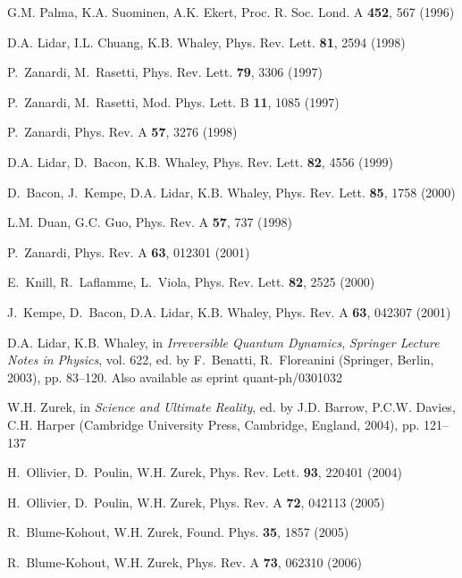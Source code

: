 \documentclass[aps,pra,reprint,amsmath,amssymb,showpacs,nofootinbib,floatfix,onecolumn,12pt]{revtex4-1}
\begin{document}
\begin{thebibliography}{100}
G.M. Palma, K.A. Suominen, A.K. Ekert, Proc. R. Soc. Lond. A \textbf{452}, 567
  (1996)

D.A. Lidar, I.L. Chuang, K.B. Whaley, Phys. Rev. Lett. \textbf{81}, 2594 (1998)

P.~Zanardi, M.~Rasetti, Phys. Rev. Lett. \textbf{79}, 3306 (1997)

P.~Zanardi, M.~Rasetti, Mod. Phys. Lett. B \textbf{11}, 1085 (1997)

P.~Zanardi, Phys. Rev. A \textbf{57}, 3276 (1998)

D.A. Lidar, D.~Bacon, K.B. Whaley, Phys. Rev. Lett. \textbf{82}, 4556 (1999)

D.~Bacon, J.~Kempe, D.A. Lidar, K.B. Whaley, Phys. Rev. Lett. \textbf{85}, 1758
  (2000)

L.M. Duan, G.C. Guo, Phys. Rev. A \textbf{57}, 737 (1998)

P.~Zanardi, Phys. Rev. A \textbf{63}, 012301 (2001)

E.~Knill, R.~Laflamme, L.~Viola, Phys. Rev. Lett. \textbf{82}, 2525 (2000)

J.~Kempe, D.~Bacon, D.A. Lidar, K.B. Whaley, Phys. Rev. A \textbf{63}, 042307
  (2001)

D.A. Lidar, K.B. Whaley, in \emph{Irreversible Quantum Dynamics},
  \emph{Springer Lecture Notes in Physics}, vol. 622, ed. by F.~Benatti,
  R.~Floreanini (Springer, Berlin, 2003), pp. 83--120.
\newblock Also available as eprint quant-ph/0301032

W.H. Zurek, in \emph{Science and Ultimate Reality}, ed. by J.D. Barrow, P.C.W.
  Davies, C.H. Harper (Cambridge University Press, Cambridge, England, 2004),
  pp. 121--137

H.~Ollivier, D.~Poulin, W.H. Zurek, Phys. Rev. Lett. \textbf{93}, 220401 (2004)

H.~Ollivier, D.~Poulin, W.H. Zurek, Phys. Rev. A \textbf{72}, 042113 (2005)

R.~Blume-Kohout, W.H. Zurek, Found. Phys. \textbf{35}, 1857 (2005)

R.~Blume-Kohout, W.H. Zurek, Phys. Rev. A \textbf{73}, 062310 (2006)


\end{thebibliography}
\end{document}
